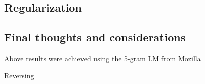 \subsection{Regularization}


\subsection{Final thoughts and considerations}

Above results were achieved using the 5-gram \ac{LM} from Mozilla 

Reversing 

%
%
%
%
%
%

